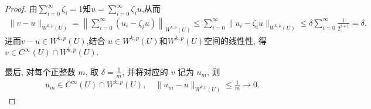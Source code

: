 \documentclass[../../main.tex]{subfiles}
\begin{document}
\begin{proof}
由$\sum\limits_{i=0}^{\infty}\zeta_i=1$知$u=\sum_{i=0}^{\infty}\zeta_{i}u$,从而
\begin{align*}
\|v-u\|_{W^{k,p}(U)}
=\left\|\sum\limits_{i=0}^{\infty}(u_i-\zeta_i u)\right\|_{W^{k,p}(U)}
\leqslant\sum\limits_{i=0}^{\infty}
\|u_i-\zeta_i u\|_{W^{k,p}(U)}
\leqslant\delta\sum\limits_{i=0}^{\infty}\frac{1}{2^{i+1}}
=\delta.
\end{align*}
进而$v-u\in W^{k,p}(U)$,结合 $u\in W^{k,p}(U)$和$W^{k,p}(U)$空间的线性性, 得 $v\in C^\infty(U)\cap W^{k,p}(U)$.

最后, 对每个正整数 $m$, 取 $\delta=\frac{1}{m}$, 并将对应的 $v$ 记为 $u_m$, 则
\begin{align*}
u_m\in C^\infty(U)\cap W^{k,p}(U),\quad
\|u_m-u\|_{W^{k,p}(U)}
\leqslant\frac{1}{m}\longrightarrow0.
\end{align*}
\end{proof}
\end{document}
